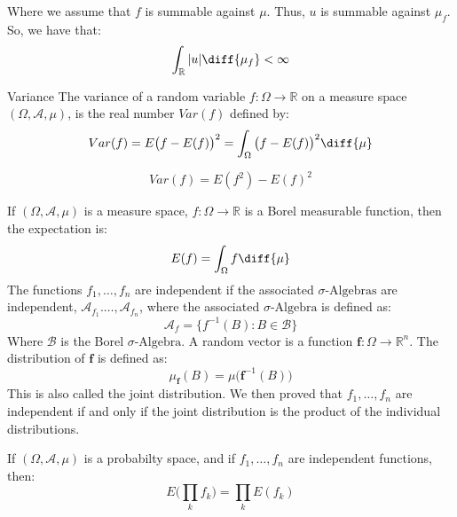     Where we assume that $f$ is summable against $\mu$. Thus,
    $u$ is summable against $\mu_{f}$. So, we have that:
    \begin{equation}
        \int_{\mathbb{R}}|u|\diff{\mu_{f}}<\infty
    \end{equation}
    \begin{ldefinition}{Variance}
        The variance of a random variable
        $f:\Omega\rightarrow\mathbb{R}$ on a measure space
        $(\Omega,\mathcal{A},\mu)$, is the real number
        $Var(f)$ defined by:
        \begin{equation}
            Var(f)=E\big(f-E(f)\big)^{2}
            =\int_{\Omega}\big(f-E(f)\big)^{2}\diff{\mu}
        \end{equation}
    \end{ldefinition}
    \begin{theorem}
        \begin{equation}
            Var(f)=E(f^{2})-E(f)^{2}
        \end{equation}
    \end{theorem}
    If $(\Omega,\mathcal{A},\mu)$ is a measure space,
    $f:\Omega\rightarrow\mathbb{R}$ is a Borel measurable
    function, then the expectation is:
    \begin{equation}
        E(f)=\int_{\Omega}f\diff{\mu}
    \end{equation}
    The functions $f_{1},\dots,f_{n}$ are independent if
    the associated $\sigma\textrm{-Algebras}$ are independent,
    $\mathcal{A}_{f_{1}}.\dots,\mathcal{A}_{f_{n}}$, where
    the associated $\sigma\textrm{-Algebra}$ is defined
    as:
    \begin{equation}
        \mathcal{A}_{f}=\{f^{\minus{1}}(B):B\in\mathcal{B}\}
    \end{equation}
    Where $\mathcal{B}$ is the Borel
    $\sigma\textrm{-Algebra}$. A random vector is a function
    $\mathbf{f}:\Omega\rightarrow\mathbb{R}^{n}$. The
    distribution of $\mathbf{f}$ is defined as:
    \begin{equation}
        \mu_{\mathbf{f}}(B)=
            \mu\big(\mathbf{f}^{\minus{1}}(B)\big)
    \end{equation}
    This is also called the joint distribution. We then proved
    that $f_{1},\dots,f_{n}$ are independent if and only
    if the joint distribution is the product of the
    individual distributions.
    \begin{theorem}
        If $(\Omega,\mathcal{A},\mu)$ is a probabilty space,
        and if $f_{1},\dots,f_{n}$ are independent functions,
        then:
        \begin{equation}
            E\Big(\prod_{k}f_{k}\Big)
            =\prod_{k}E(f_{k})
        \end{equation}
    \end{theorem}
